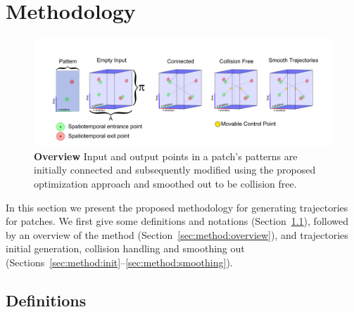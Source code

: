\section{Methodology}
\label{sec:method}

\begin{figure}[t]
	\begin{center}
	\includegraphics[width=0.9\linewidth]{./images/overview-hd.png}
	\caption{
		\textbf{Overview} Input and output points in a patch's patterns are initially connected and subsequently modified using the proposed optimization approach and smoothed out to be collision free.
	}
	\label{fig:overview}
	\end{center}
\end{figure}


In this section we present the proposed methodology for generating trajectories for patches.
We first give some definitions and notations (Section~\ref{sec:method:definitions}), followed by an overview of the method (Section~\ref{sec:method:overview}), and trajectories initial generation, collision handling and smoothing out (Sections~\ref{sec:method:init}--\ref{sec:method:smoothing}).


\subsection{Definitions}
\label{sec:method:definitions}

